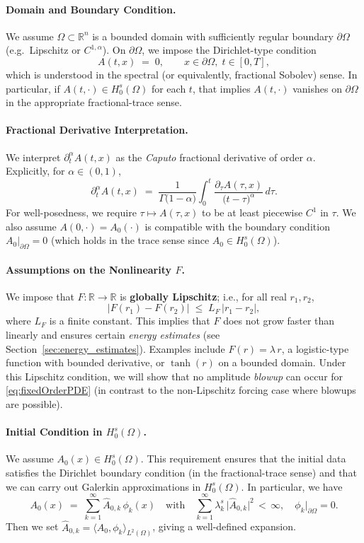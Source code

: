 \documentclass[12pt]{article}
\begin{document}
\paragraph{Domain and Boundary Condition.}
We assume \(\Omega\subset\mathbb{R}^n\) is a bounded domain with sufficiently regular
boundary \(\partial\Omega\) (e.g.\ Lipschitz or \(C^{1,\alpha}\)). On \(\partial\Omega\),
we impose the Dirichlet-type condition
\[
  A(t,x) \;=\; 0,
  \qquad x\in \partial\Omega,\; t\in [0,T],
\]
which is understood in the spectral (or equivalently, fractional Sobolev) sense.  In
particular, if \(A(t,\cdot)\in H_0^s(\Omega)\) for each \(t\), that implies
\(A(t,\cdot)\) vanishes on \(\partial\Omega\) in the appropriate fractional-trace sense.

\paragraph{Fractional Derivative Interpretation.}
We interpret \(\partial_t^\alpha A(t,x)\) as the \emph{Caputo} fractional derivative of
order \(\alpha\).  Explicitly, for \(\alpha\in(0,1)\),
\[
\partial_t^\alpha A(t,x)
\;=\;
\frac{1}{\Gamma\bigl(1-\alpha\bigr)}
\int_{0}^{t}
\frac{\partial_\tau A(\tau,x)}{\bigl(t-\tau\bigr)^\alpha}\,d\tau.
\]
For well-posedness, we require \(\tau\mapsto A(\tau,x)\) to be at least piecewise
\(C^1\) in \(\tau\). We also assume \(A(0,\cdot)=A_0(\cdot)\) is compatible with the
boundary condition \(A_0|_{\partial\Omega}=0\) (which holds in the trace sense since
\(A_0\in H_0^s(\Omega)\)).

\paragraph{Assumptions on the Nonlinearity \(F\).}
We impose that \(F\colon \mathbb{R}\to\mathbb{R}\) is \textbf{globally Lipschitz}; i.e.,
for all real \(r_1,r_2\),
\[
\lvert F(r_1) - F(r_2)\rvert
\;\le\;
L_F\,\lvert r_1 - r_2\rvert,
\]
where \(L_F\) is a finite constant. This implies that \(F\) does not grow faster than linearly
and ensures certain \emph{energy estimates} (see Section~\ref{sec:energy_estimates}).  
Examples include \(F(r)=\lambda\,r\), a logistic-type function with bounded derivative, or
\(\tanh(r)\) on a bounded domain.  Under this Lipschitz condition, we will show that no
amplitude \emph{blowup} can occur for \eqref{eq:fixedOrderPDE} (in contrast to the
non-Lipschitz forcing case where blowups are possible).

\paragraph{Initial Condition in \(H_0^s(\Omega)\).}
We assume \(A_0(x)\in H_0^s(\Omega)\).  This requirement ensures that the initial data
satisfies the Dirichlet boundary condition (in the fractional-trace sense) and that we can
carry out Galerkin approximations in \(H_0^s(\Omega)\).  In particular, we have
\[
A_0(x)
\;=\;
\sum_{k=1}^\infty
  \hat{A}_{0,k}\,\phi_k(x)
\quad\text{with}\quad
\sum_{k=1}^\infty
  \lambda_k^s\,
  \lvert \hat{A}_{0,k}\rvert^2
\,<\,\infty,
\quad
\phi_k\big|_{\partial\Omega}=0.
\]
Then we set 
\(\hat{A}_{0,k}=\langle A_0,\phi_k\rangle_{L^2(\Omega)}\), giving a well-defined expansion.
\end{document}
